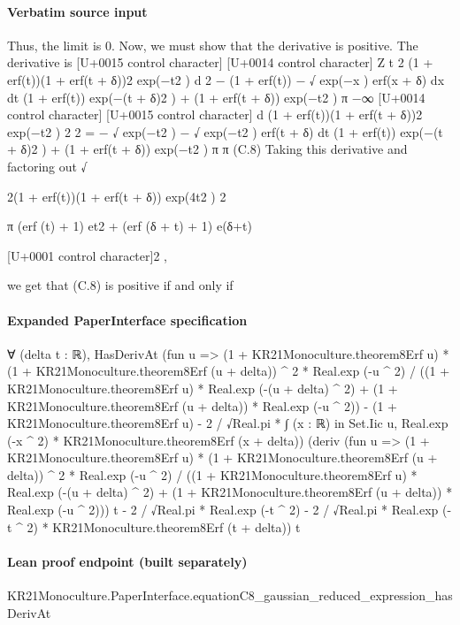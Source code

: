 \documentclass[10pt]{article}
\begin{document}
\paragraph{Verbatim source input}
\begin{ReviewVerbatim}
Thus, the limit is 0. Now, we must show that the derivative is positive. The derivative is
[U+0015 control character]
[U+0014 control character]
Z t
2
(1 + erf(t))(1 + erf(t + δ))2 exp(−t2 )
d
2
− (1 + erf(t)) − √
exp(−x ) erf(x + δ) dx
dt (1 + erf(t)) exp(−(t + δ)2 ) + (1 + erf(t + δ)) exp(−t2 )
π −∞
[U+0014 control character]
[U+0015 control character]
d
(1 + erf(t))(1 + erf(t + δ))2 exp(−t2 )
2
2
=
− √ exp(−t2 ) − √ exp(−t2 ) erf(t + δ)
dt (1 + erf(t)) exp(−(t + δ)2 ) + (1 + erf(t + δ)) exp(−t2 )
π
π
(C.8)
Taking this derivative and factoring out
√

2(1 + erf(t))(1 + erf(t + δ)) exp(4t2 )
2

π (erf (t) + 1) et2 + (erf (δ + t) + 1) e(δ+t)

[U+0001 control character]2 ,

we get that (C.8) is positive if and only if
\end{ReviewVerbatim}


\paragraph{Expanded PaperInterface specification}
\begin{ReviewVerbatim}
∀ (delta t : ℝ),
  HasDerivAt
    (fun u =>
      (1 + KR21Monoculture.theorem8Erf u) * (1 + KR21Monoculture.theorem8Erf (u + delta)) ^ 2 * Real.exp (-u ^ 2) /
            ((1 + KR21Monoculture.theorem8Erf u) * Real.exp (-(u + delta) ^ 2) +
              (1 + KR21Monoculture.theorem8Erf (u + delta)) * Real.exp (-u ^ 2)) -
          (1 + KR21Monoculture.theorem8Erf u) -
        2 / √Real.pi * ∫ (x : ℝ) in Set.Iic u, Real.exp (-x ^ 2) * KR21Monoculture.theorem8Erf (x + delta))
    (deriv
          (fun u =>
            (1 + KR21Monoculture.theorem8Erf u) * (1 + KR21Monoculture.theorem8Erf (u + delta)) ^ 2 *
                Real.exp (-u ^ 2) /
              ((1 + KR21Monoculture.theorem8Erf u) * Real.exp (-(u + delta) ^ 2) +
                (1 + KR21Monoculture.theorem8Erf (u + delta)) * Real.exp (-u ^ 2)))
          t -
        2 / √Real.pi * Real.exp (-t ^ 2) -
      2 / √Real.pi * Real.exp (-t ^ 2) * KR21Monoculture.theorem8Erf (t + delta))
    t
\end{ReviewVerbatim}

\paragraph{Lean proof endpoint (built separately)}\begin{ReviewVerbatim}
KR21Monoculture.PaperInterface.equationC8_gaussian_reduced_expression_hasDerivAt
\end{ReviewVerbatim}
\end{document}
